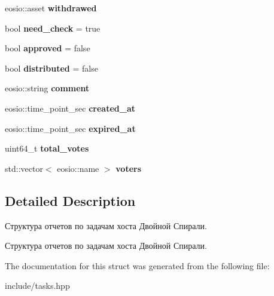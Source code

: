 \begin{DoxyCompactItemize}
\mbox{\label{structreports3_aff965e010c116551b43d97b9e402994f}} 
eosio\+::asset {\bfseries withdrawed}
\item 
\mbox{\label{structreports3_a219b0d07e6707bde21acbec7d9b49dd7}} 
bool {\bfseries need\+\_\+check} = true
\item 
\mbox{\label{structreports3_a3efe232c9e28e3bdaeabd6713204a88c}} 
bool {\bfseries approved} = false
\item 
\mbox{\label{structreports3_a0618148885e6db5d37751e1318ce2b1c}} 
bool {\bfseries distributed} = false
\item 
\mbox{\label{structreports3_a71e900f1eb1b73cee55c4cdb0d80c027}} 
eosio\+::string {\bfseries comment}
\item 
\mbox{\label{structreports3_a825f77becac6fd1df509fedcf4ac910e}} 
eosio\+::time\+\_\+point\+\_\+sec {\bfseries created\+\_\+at}
\item 
\mbox{\label{structreports3_ae7cb23c8867ab37df6b257c9e5c43033}} 
eosio\+::time\+\_\+point\+\_\+sec {\bfseries expired\+\_\+at}
\item 
\mbox{\label{structreports3_a749104ff4d8f14a4cdb1e5eada51cf2d}} 
uint64\+\_\+t {\bfseries total\+\_\+votes}
\item 
\mbox{\label{structreports3_ad17e01089c5b3d67155663e56a5d58bb}} 
std\+::vector$<$ eosio\+::name $>$ {\bfseries voters}
\end{DoxyCompactItemize}


\subsection{Detailed Description}
Структура отчетов по задачам хоста Двойной Спирали. 

Структура отчетов по задачам хоста Двойной Спирали. 

The documentation for this struct was generated from the following file\+:\begin{DoxyCompactItemize}
\item 
include/tasks.\+hpp\end{DoxyCompactItemize}
